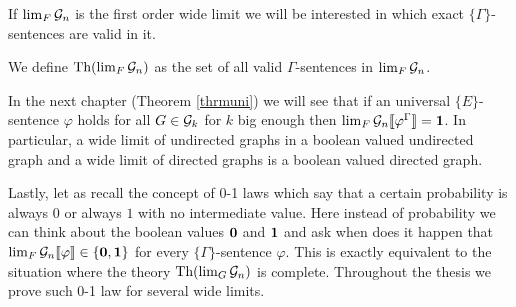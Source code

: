 If $\lim_F\mathcal{G}_n$ is the first order wide limit we will be interested in which exact $\{\Gamma\}$-sentences are valid in it.

\begin{defi}
We define $\text{Th}(\lim_F\mathcal{G}_n)$ as the set of all valid $\Gamma$-sentences in $\lim_{F}\mathcal{G}_n$.
\end{defi}

In the next chapter (Theorem \ref{thrmuni}) we will see that if an universal $\{E\}$-sentence $\varphi$ holds for all $G\in\mathcal{G}_k$ for $k$ big enough then $\lim_F\mathcal{G}_n\llbracket\varphi^\Gamma\rrbracket=\textbf{1}$. In particular, a wide limit of undirected graphs in a boolean valued undirected graph and a wide limit of directed graphs is a boolean valued directed graph.

Lastly, let as recall the concept of 0-1 laws which say that a certain probability is always $0$ or always $1$ with no intermediate value. Here instead of probability we can think about the boolean values $\textbf{0}$ and $\textbf{1}$ and ask when does it happen that $\lim_F\mathcal{G}_n\llbracket\varphi\rrbracket\in\{\textbf{0},\textbf{1}\}$ for every $\{\Gamma\}$-sentence $\varphi$. This is exactly equivalent to the situation where the theory $\text{Th}(\lim_G \mathcal{G}_n)$ is complete. Throughout the thesis we prove such 0-1 law for several wide limits.
